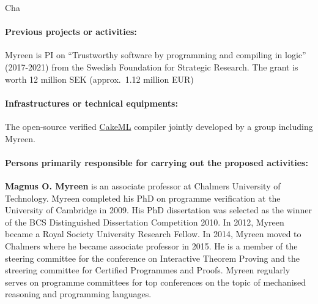 \begin{sitedescription}{Cha}
\paragraph*{Previous projects or activities:}


\begin{compactitem}
\item Myreen is PI on ``Trustworthy software by programming and compiling in logic'' (2017-2021) from the Swedish Foundation for Strategic Research. The grant is worth 12 million SEK (approx.\ 1.12 million EUR)
\end{compactitem}

\paragraph*{Infrastructures or technical equipments:}


\begin{compactitem}
\item The open-source verified \href{https://cakeml.org/}{CakeML}
  compiler jointly developed by a group including Myreen.
\end{compactitem}

\paragraph*{Persons primarily responsible for carrying out the proposed activities:}

\begin{compactitem}
\item \textbf{Magnus O. Myreen} is an associate professor at Chalmers
  University of Technology.  Myreen completed his PhD on programme
  verification at the University of Cambridge in 2009. His PhD
  dissertation was selected as the winner of the BCS Distinguished
  Dissertation Competition 2010. In 2012, Myreen became a Royal
  Society University Research Fellow. In 2014, Myreen moved to
  Chalmers where he became associate professor in 2015.  He is a
  member of the steering committee for the conference on Interactive
  Theorem Proving and the streering committee for Certified Programmes
  and Proofs.  Myreen regularly serves on programme committees for top
  conferences on the topic of mechanised reasoning and programming
  languages.
\end{compactitem}

\end{sitedescription}

